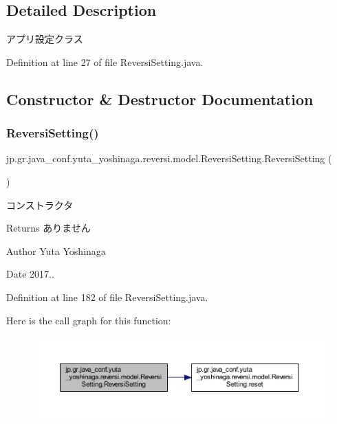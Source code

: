 \subsection{Detailed Description}
アプリ設定クラス 

Definition at line 27 of file Reversi\+Setting.\+java.



\subsection{Constructor \& Destructor Documentation}
\mbox{\label{classjp_1_1gr_1_1java__conf_1_1yuta__yoshinaga_1_1reversi_1_1model_1_1_reversi_setting_a0e2fd0216ad010dbbc9112297a6c29c4}} 
\subsubsection{\texorpdfstring{Reversi\+Setting()}{ReversiSetting()}}
{\footnotesize\ttfamily jp.\+gr.\+java\+\_\+conf.\+yuta\+\_\+yoshinaga.\+reversi.\+model.\+Reversi\+Setting.\+Reversi\+Setting (\begin{DoxyParamCaption}{ }\end{DoxyParamCaption})}



コンストラクタ 

\begin{DoxyReturn}{Returns}
ありません 
\end{DoxyReturn}
\begin{DoxyAuthor}{Author}
Yuta Yoshinaga 
\end{DoxyAuthor}
\begin{DoxyDate}{Date}
2017.. 
\end{DoxyDate}


Definition at line 182 of file Reversi\+Setting.\+java.

Here is the call graph for this function\+:
\nopagebreak
\begin{figure}[H]
\begin{center}
\leavevmode
\includegraphics[width=350pt]{classjp_1_1gr_1_1java__conf_1_1yuta__yoshinaga_1_1reversi_1_1model_1_1_reversi_setting_a0e2fd0216ad010dbbc9112297a6c29c4_cgraph}
\end{center}
\end{figure}


